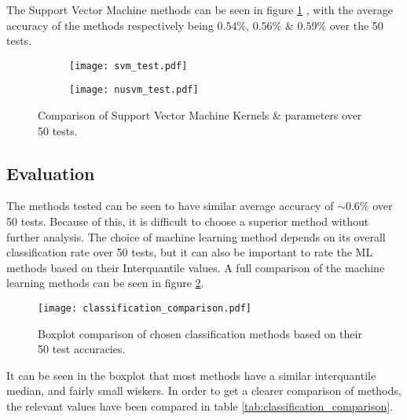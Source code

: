 \documentclass[../main.tex]{subfiles}
\begin{document}
The Support Vector Machine methods can be seen in figure \ref{fig:svm_test} , with the average accuracy of the methods respectively being $0.54\%$, $0.56\%$ \& $0.59\%$ over the 50 tests.

\begin{figure}[H]
    \centering
    \begin{subfigure}[b]{1\textwidth}
        \centering
\texttt{[image: svm\_test.pdf]}
    \end{subfigure}
    \centering
    \begin{subfigure}[b]{1\textwidth}
        \centering
\texttt{[image: nusvm\_test.pdf]}
    \end{subfigure}
    \caption{Comparison of Support Vector Machine Kernels \& parameters over 50 tests.}
\label{fig:svm_test}
\end{figure}

\subsection{Evaluation}

The methods tested can be seen to have similar average accuracy of $\sim 0.6\%$ over 50 tests.
Because of this, it is difficult to choose a superior method without further analysis.
The choice of machine learning method depends on its overall classification rate over 50 tests, but it can also be important to rate the ML methods based on their Interquantile values.
A full comparison of the machine learning methods can be seen in figure \ref{fig:classification_comparison}.

\begin{figure}[H]
\begin{center}
\texttt{[image: classification\_comparison.pdf]}
\caption{Boxplot comparison of chosen classification methods based on their 50 test accuracies.}
\label{fig:classification_comparison}
\end{center}
\end{figure}

It can be seen in the boxplot that most methods have a similar interquantile median, and fairly small wiskers.
In order to get a clearer comparison of methods, the relevant values have been compared in table \ref{tab:classification_comparison}.  
\end{document}
